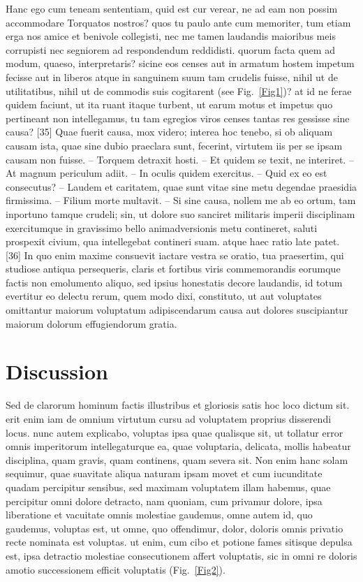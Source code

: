 \documentclass[a4paper,12pt]{article}
\begin{document}
Hanc ego cum teneam sententiam, quid est cur verear, ne ad eam non possim accommodare
Torquatos nostros? quos tu paulo ante cum memoriter, tum etiam erga nos amice et benivole
collegisti, nec me tamen laudandis maioribus meis corrupisti nec segniorem ad respondendum
reddidisti. quorum facta quem ad modum, quaeso, interpretaris? sicine eos censes aut in
armatum hostem impetum fecisse aut in liberos atque in sanguinem suum tam crudelis fuisse,
nihil ut de utilitatibus, nihil ut de commodis suis cogitarent (see Fig.~\ref{Fig1})?
at id ne ferae quidem faciunt, ut ita ruant itaque turbent, ut earum motus et impetus quo
pertineant non intellegamus, tu tam egregios viros censes tantas res gessisse sine causa?
[35] Quae fuerit causa, mox videro; interea hoc tenebo, si ob aliquam causam ista, quae
sine dubio praeclara sunt, fecerint, virtutem iis per se ipsam causam non fuisse. --
Torquem detraxit hosti. -- Et quidem se texit, ne interiret. -- At magnum periculum
adiit. -- In oculis quidem exercitus. -- Quid ex eo est consecutus? -- Laudem et
caritatem, quae sunt vitae sine metu degendae praesidia firmissima. -- Filium morte
multavit. -- Si sine causa, nollem me ab eo ortum, tam inportuno tamque crudeli; sin, ut
dolore suo sanciret militaris imperii disciplinam exercitumque in gravissimo bello
animadversionis metu contineret, saluti prospexit civium, qua intellegebat contineri
suam. atque haec ratio late patet. [36] In quo enim maxime consuevit iactare vestra se
oratio, tua praesertim, qui studiose antiqua persequeris, claris et fortibus viris
commemorandis eorumque factis non emolumento aliquo, sed ipsius honestatis decore
laudandis, id totum evertitur eo delectu rerum, quem modo dixi, constituto, ut aut
voluptates omittantur maiorum voluptatum adipiscendarum causa aut dolores suscipiantur
maiorum dolorum effugiendorum gratia.


\section*{Discussion}

Sed de clarorum hominum factis illustribus et gloriosis satis hoc loco dictum sit. erit
enim iam de omnium virtutum cursu ad voluptatem proprius disserendi locus. nunc autem
explicabo, voluptas ipsa quae qualisque sit, ut tollatur error omnis imperitorum
intellegaturque ea, quae voluptaria, delicata, mollis habeatur disciplina, quam gravis,
quam continens, quam severa sit. Non enim hanc solam sequimur, quae suavitate aliqua
naturam ipsam movet et cum iucunditate quadam percipitur sensibus, sed maximam voluptatem
illam habemus, quae percipitur omni dolore detracto, nam quoniam, cum privamur dolore,
ipsa liberatione et vacuitate omnis molestiae gaudemus, omne autem id, quo gaudemus,
voluptas est, ut omne, quo offendimur, dolor, doloris omnis privatio recte nominata est
voluptas. ut enim, cum cibo et potione fames sitisque depulsa est, ipsa detractio
molestiae consecutionem affert voluptatis, sic in omni re doloris amotio successionem
efficit voluptatis (Fig.~\ref{Fig2}). 
\end{document}
